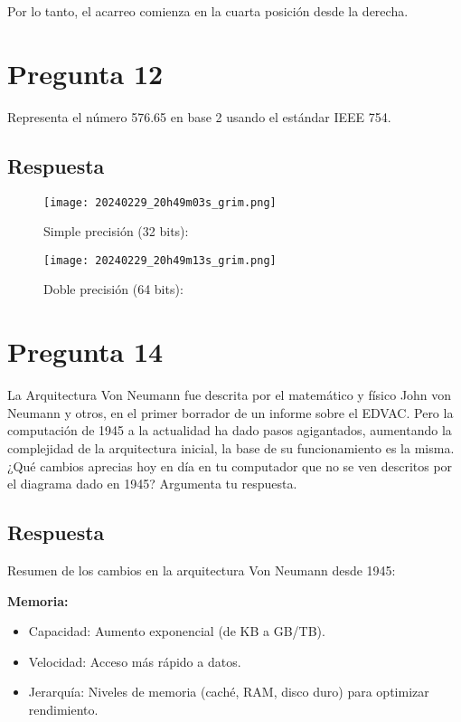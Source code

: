 \documentclass{article}
\begin{document}
Por lo tanto, el acarreo comienza en la cuarta posición desde la derecha.




\section*{Pregunta 12}

Representa el número 576.65 en base 2 usando el estándar IEEE 754.

\subsection*{Respuesta}

\begin{figure}[H]
    \centering
    \texttt{[image: 20240229\_20h49m03s\_grim.png]}
    \caption{Simple precisión (32 bits):}
    \label{fig:enter-label1}
\end{figure}

\begin{figure}[H]
    \centering
    \texttt{[image: 20240229\_20h49m13s\_grim.png]}
    \caption{Doble precisión (64 bits):}
    \label{fig:enter-label2}
\end{figure}

\section*{Pregunta 14}

La Arquitectura Von Neumann fue descrita por el matemático y físico John von Neumann y otros, en el primer borrador de un informe sobre el EDVAC. Pero la computación de 1945 a la actualidad ha dado pasos agigantados, aumentando la complejidad de la arquitectura inicial, la base de su funcionamiento es la misma. ¿Qué cambios aprecias hoy en día en tu computador que no se ven descritos por el diagrama dado en 1945? Argumenta tu respuesta.

\subsection*{Respuesta}

Resumen de los cambios en la arquitectura Von Neumann desde 1945:

\textbf{Memoria:}

\begin{itemize}
  \item Capacidad: Aumento exponencial (de KB a GB/TB).
  \item Velocidad: Acceso más rápido a datos.
  \item Jerarquía: Niveles de memoria (caché, RAM, disco duro) para optimizar rendimiento.
\end{itemize}
\end{document}
